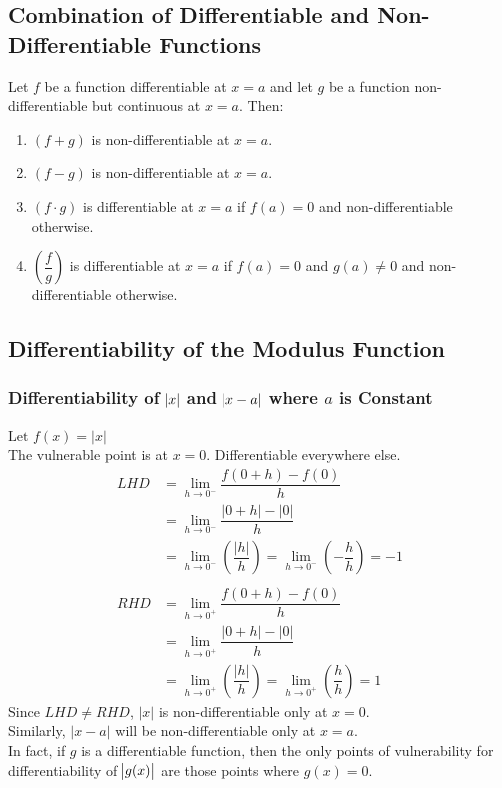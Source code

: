 \documentclass[14]{article}
\theoremstyle{definition}
\begin{document}
\subsection{Combination of Differentiable and Non-Differentiable Functions}
Let $f$ be a function differentiable at $x=a$ and let $g$ be a function non-differentiable but continuous at $x=a$. Then:\\
\begin{enumerate}
\item $(f+g)$ is non-differentiable at $x = a$.
\item $(f-g)$ is non-differentiable at $x = a$.
\item $(f\cdot g)$ is differentiable at $x = a$ if $f(a) = 0$ and non-differentiable otherwise.
\item $\left(\dfrac{f}{g} \right)$ is differentiable at $x = a$ if $f(a) = 0$ and $g(a) \neq 0$ and non-differentiable otherwise.
\end{enumerate}
\subsection{Differentiability of the Modulus Function}
\subsubsection{Differentiability of $\abs{x}$ and $\abs{x - a}$ where $a$ is Constant}
$\text{Let }f(x) = \lvert x \rvert$\\
The vulnerable point is at $x = 0$. Differentiable everywhere else.
\begin{align*}
{LHD} &= \lim\limits_{h \to 0^-} \dfrac{f(0+h) - f(0)}{h}\\
&= \lim\limits_{h \to 0^-} \dfrac{\lvert 0 + h \rvert - \lvert 0 \rvert}{h}\\
&= \lim\limits_{h \to 0^-} \left(\dfrac{\lvert h \rvert}{h}\right) =\lim\limits_{h \to 0^-} \left(- \dfrac{h}{h} \right) = -1\\\\
{RHD} &=\lim\limits_{h \to 0^+} \dfrac{f(0+h) - f(0)}{h}\\
&= \lim\limits_{h \to 0^+} \dfrac{\lvert 0 + h \rvert - \lvert 0 \rvert}{h}\\
&= \lim\limits_{h \to 0^+} \left(\dfrac{\lvert h \rvert}{h}\right) =\lim\limits_{h \to 0^+} \left( \dfrac{h}{h} \right) = 1
\end{align*}
Since $LHD \neq RHD$, $|x|$ is non-differentiable only at $x = 0$.\\
Similarly, $\lvert x - a \rvert$ will be non-differentiable only at $x = a$.\\
In fact, if $g$ is a differentiable function, then the only points of vulnerability for differentiability of $\abs{g(x)}$ are those points  where $g(x) = 0$.
\end{document}
